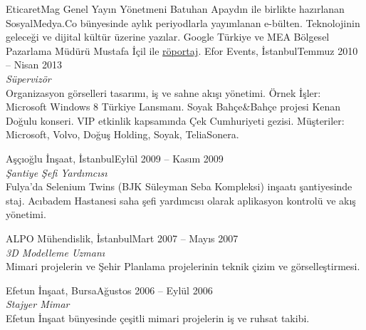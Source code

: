\documentclass[8pt]{scrartcl}
\newenvironment{xplist}{%
  \newcommand\xpitem[4]{%
    {\color{header}%
      \sc##2\hfill ##1}\\[2pt]
    {\Large\textit{##3}
      \smallskip} \\%
    {##4\bigskip}%

  }}%
{\setlist{}}
\begin{document}
\begin{xplist}
{{      EticaretMag Genel  Yayın Yönetmeni Batuhan Apaydın  ile birlikte
      hazırlanan   SosyalMedya.Co    bünyesinde   aylık   periyodlarla
      yayımlanan  e-bülten. Teknolojinin  geleceği  ve dijital  kültür
      üzerine yazılar. Google Türkiye ve MEA Bölgesel Pazarlama Müdürü
      Mustafa                         İçil                         ile
      \href{http://sosyalmedya.co/google-mustafa-icil/}{röportaj}.}%
    \xpitem%
    {Temmuz 2010 -- Nisan 2013}%
    {Efor Events, İstanbul}%
    {Süpervizör}{%
      Organizasyon görselleri  tasarımı, iş  ve sahne  akışı yönetimi.
      Örnek  İşler:  Microsoft  Windows  8  Türkiye  Lansmanı.   Soyak
      Bahçe\&Bahçe  projesi   Kenan  Doğulu  konseri.    VIP  etkinlik
      kapsamında  Çek  Cumhuriyeti   gezisi.   Müşteriler:  Microsoft,
      Volvo, Doğuş Holding, Soyak, TeliaSonera.}%
    \xpitem%
    {Eylül 2009 -- Kasım 2009}%
    {Aşçıoğlu İnşaat, İstanbul}%
    {Şantiye Şefi Yardımcısı}{%
      Fulya'da Selenium  Twins (BJK  Süleyman Seba  Kompleksi) inşaatı
      şantiyesinde  staj.   Acıbadem  Hastanesi saha  şefi  yardımcısı
      olarak aplikasyon kontrolü ve akış yönetimi.  }%
    \xpitem%
    {Mart 2007 -- Mayıs 2007}%
    {ALPO Mühendislik, İstanbul}%
    {3D Modelleme Uzmanı}{%
      Mimari projelerin ve Şehir Planlama projelerinin teknik çizim ve
      görselleştirmesi.  }%
    \xpitem%
    {Ağustos 2006 -- Eylül 2006}%
    {Efetun İnşaat, Bursa}%
    {Stajyer Mimar}{%
      Efetun İnşaat bünyesinde çeşitli  mimari projelerin iş ve ruhsat
      takibi.}}%
\end{xplist}
\end{document}

